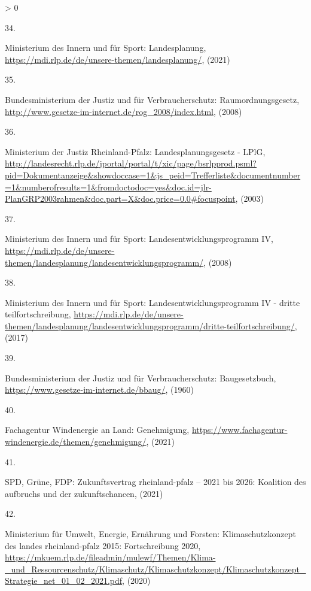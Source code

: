\documentclass[a4paper,11pt]{article}
\newlength{\cslhangindent}
\newlength{\csllabelwidth}
\newenvironment{CSLReferences}[3] %
 {%
  \setlength{\parindent}{0pt}
  \ifodd #1 \everypar{\setlength{\hangindent}{\cslhangindent}}\ignorespaces\fi
  \ifnum #2 > 0
  \setlength{\parskip}{#2\baselineskip}
  \fi
 }%
 {}
\newcommand{\CSLLeftMargin}[1]{\parbox[t]{\maxof{\widthof{#1}}{\csllabelwidth}}{#1}}
\newcommand{\CSLRightInline}[1]{\parbox[t]{\linewidth}{#1}}
\begin{document}
\begin{CSLReferences}{0}{0}
\leavevmode\hypertarget{ref-MinisteriumdesInnernundfurSport.2021}{}%
\CSLLeftMargin{34. }
\CSLRightInline{Ministerium des Innern und für Sport: Landesplanung, \url{https://mdi.rlp.de/de/unsere-themen/landesplanung/}, (2021)}

\leavevmode\hypertarget{ref-BundesministeriumderJustizundfurVerbraucherschutz.2008}{}%
\CSLLeftMargin{35. }
\CSLRightInline{Bundesministerium der Justiz und für Verbraucherschutz: Raumordnungsgesetz, \url{http://www.gesetze-im-internet.de/rog_2008/index.html}, (2008)}

\leavevmode\hypertarget{ref-MinisteriumderJustizRheinlandPfalz.2003}{}%
\CSLLeftMargin{36. }
\CSLRightInline{Ministerium der Justiz Rheinland-Pfalz: Landesplanungsgesetz - LPlG, \url{http://landesrecht.rlp.de/jportal/portal/t/xic/page/bsrlpprod.psml?pid=Dokumentanzeige\&showdoccase=1\&js_peid=Trefferliste\&documentnumber=1\&numberofresults=1\&fromdoctodoc=yes\&doc.id=jlr-PlanGRP2003rahmen\&doc.part=X\&doc.price=0.0\#focuspoint}, (2003)}

\leavevmode\hypertarget{ref-MinisteriumdesInnernundfurSport.2008}{}%
\CSLLeftMargin{37. }
\CSLRightInline{Ministerium des Innern und für Sport: Landesentwicklungsprogramm IV, \url{https://mdi.rlp.de/de/unsere-themen/landesplanung/landesentwicklungsprogramm/}, (2008)}

\leavevmode\hypertarget{ref-MinisteriumdesInnernundfurSport.2017}{}%
\CSLLeftMargin{38. }
\CSLRightInline{Ministerium des Innern und für Sport: Landesentwicklungsprogramm IV - dritte teilfortschreibung, \url{https://mdi.rlp.de/de/unsere-themen/landesplanung/landesentwicklungsprogramm/dritte-teilfortschreibung/}, (2017)}

\leavevmode\hypertarget{ref-BundesministeriumderJustizundfurVerbraucherschutz.1960}{}%
\CSLLeftMargin{39. }
\CSLRightInline{Bundesministerium der Justiz und für Verbraucherschutz: Baugesetzbuch, \url{https://www.gesetze-im-internet.de/bbaug/}, (1960)}

\leavevmode\hypertarget{ref-FachagenturWindenergieanLand.2021}{}%
\CSLLeftMargin{40. }
\CSLRightInline{Fachagentur Windenergie an Land: Genehmigung, \url{https://www.fachagentur-windenergie.de/themen/genehmigung/}, (2021)}

\leavevmode\hypertarget{ref-SPD.2021}{}%
\CSLLeftMargin{41. }
\CSLRightInline{SPD, Grüne, FDP: Zukunftsvertrag rheinland-pfalz -- 2021 bis 2026: Koalition des aufbruchs und der zukunftschancen, (2021)}

\leavevmode\hypertarget{ref-MinisteriumfurUmweltEnergieErnahrungundForsten.2020b}{}%
\CSLLeftMargin{42. }
\CSLRightInline{Ministerium für Umwelt, Energie, Ernährung und Forsten: Klimaschutzkonzept des landes rheinland-pfalz 2015: Fortschreibung 2020, \url{https://mkuem.rlp.de/fileadmin/mulewf/Themen/Klima-_und_Ressourcenschutz/Klimaschutz/Klimaschutzkonzept/Klimaschutzkonzept_Strategie_net_01_02_2021.pdf}, (2020)}


\end{CSLReferences}
\end{document}

